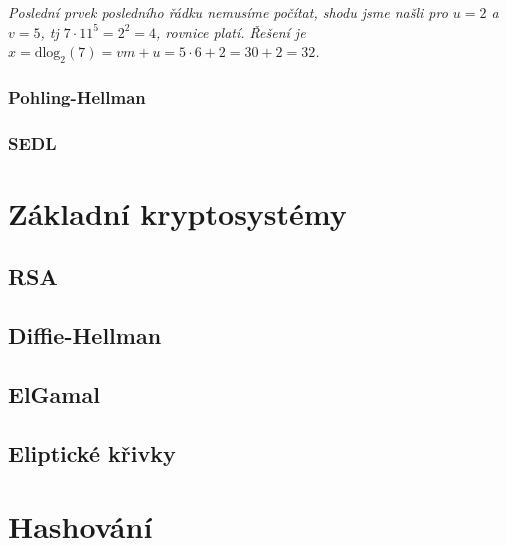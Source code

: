 \documentclass[10pt,a4paper]{article}
\begin{document}
\textit{Poslední prvek posledního řádku nemusíme počítat, shodu jsme našli pro $u=2$ a $v=5$, tj $7\cdot 11^5 = 2^2 = 4$, rovnice platí. Řešení je $x = \text{dlog}_2 (7) = vm + u = 5\cdot6 + 2 = 30 + 2 = 32$. }

\subsubsection{Pohling-Hellman}
\subsubsection{SEDL}


\section{Základní kryptosystémy}
\subsection{RSA}
\subsection{Diffie-Hellman}
\subsection{ElGamal}
\subsection{Eliptické křivky}

\section{Hashování}
\end{document}
